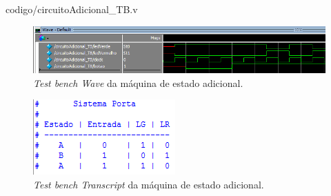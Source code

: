 	
	{codigo/circuitoAdicional_TB.v}

	\begin{figure}[H]
		\includegraphics[width=1\textwidth]{img/maquinaAdicional/testBenchWave}
		\caption{\textit{Test bench Wave} da máquina de estado adicional.}
		\label{figura:testBenchWaveAdicional}
	\end{figure}

	\begin{figure}[H]
		\centering
		\includegraphics{img/maquinaAdicional/testBenchTranscript}
		\caption{\textit{Test bench Transcript} da máquina de estado adicional.}
		\label{figura:testBenchTranscriptAdicional}
	\end{figure}
